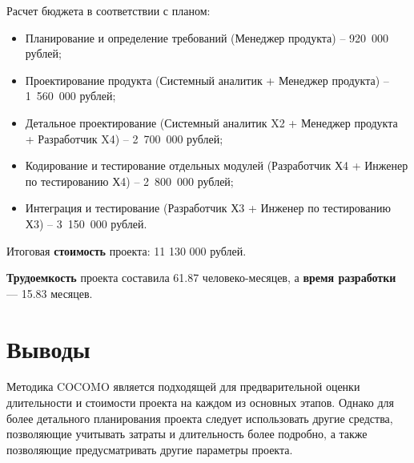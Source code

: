 Расчет бюджета в соответствии с планом:
\begin{itemize}[label = ---]
	\item Планирование и определение требований (Менеджер продукта) – 920~000 рублей;
	\item Проектирование продукта (Системный аналитик + Менеджер продукта)
	– 1~560~000 рублей;
	\item Детальное проектирование (Системный аналитик X2 + Менеджер продукта + Разработчик X4) – 2~700~000 рублей;
	\item Кодирование и тестирование отдельных модулей (Разработчик Х4
	+ Инженер по тестированию Х4) – 2~800~000 рублей;
	\item Интеграция и тестирование (Разработчик Х3 + Инженер по тестированию Х3) – 3~150~000 рублей.
\end{itemize}

Итоговая \textbf{стоимость} проекта: 11 130 000 рублей.

\textbf{Трудоемкость} проекта составила 61.87 человеко-месяцев, а \textbf{время разработки} --- 15.83 месяцев.

\section*{Выводы}

Методика COCOMO является подходящей для предварительной оценки длительности и стоимости проекта на каждом из основных этапов. Однако для более
детального планирования проекта следует использовать другие средства,
позволяющие учитывать затраты и длительность более подробно, а также
позволяющие предусматривать другие параметры проекта.


